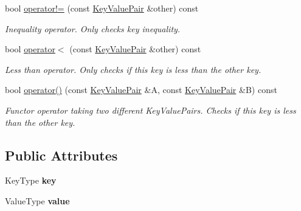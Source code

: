 \begin{DoxyCompactItemize}
bool \mbox{\hyperlink{struct_arcana_1_1_key_value_pair_a4998b66f9f46840ed34a38f7eac61de3}{operator!=}} (const \mbox{\hyperlink{struct_arcana_1_1_key_value_pair}{Key\+Value\+Pair}} \&other) const
\begin{DoxyCompactList}\small\item\em Inequality operator. Only checks key inequality. \end{DoxyCompactList}\item 
\mbox{\label{struct_arcana_1_1_key_value_pair_a83febe1b51b6e4045a4c20a6e3b1b716}} 
bool \mbox{\hyperlink{struct_arcana_1_1_key_value_pair_a83febe1b51b6e4045a4c20a6e3b1b716}{operator$<$}} (const \mbox{\hyperlink{struct_arcana_1_1_key_value_pair}{Key\+Value\+Pair}} \&other) const
\begin{DoxyCompactList}\small\item\em Less than operator. Only checks if this key is less than the other key. \end{DoxyCompactList}\item 
\mbox{\label{struct_arcana_1_1_key_value_pair_a510a057a546badb0bb02c88dfa61ad15}} 
bool \mbox{\hyperlink{struct_arcana_1_1_key_value_pair_a510a057a546badb0bb02c88dfa61ad15}{operator()}} (const \mbox{\hyperlink{struct_arcana_1_1_key_value_pair}{Key\+Value\+Pair}} \&A, const \mbox{\hyperlink{struct_arcana_1_1_key_value_pair}{Key\+Value\+Pair}} \&B) const
\begin{DoxyCompactList}\small\item\em Functor operator taking two different Key\+Value\+Pairs. Checks if this key is less than the other key. \end{DoxyCompactList}\end{DoxyCompactItemize}
\subsection*{Public Attributes}
\begin{DoxyCompactItemize}
\item 
\mbox{\label{struct_arcana_1_1_key_value_pair_a7fb93bbd899926462e6504bf1b433089}} 
Key\+Type {\bfseries key}
\item 
\mbox{\label{struct_arcana_1_1_key_value_pair_a79ee05436469e504508ca0597920c77a}} 
Value\+Type {\bfseries value}
\end{DoxyCompactItemize}


